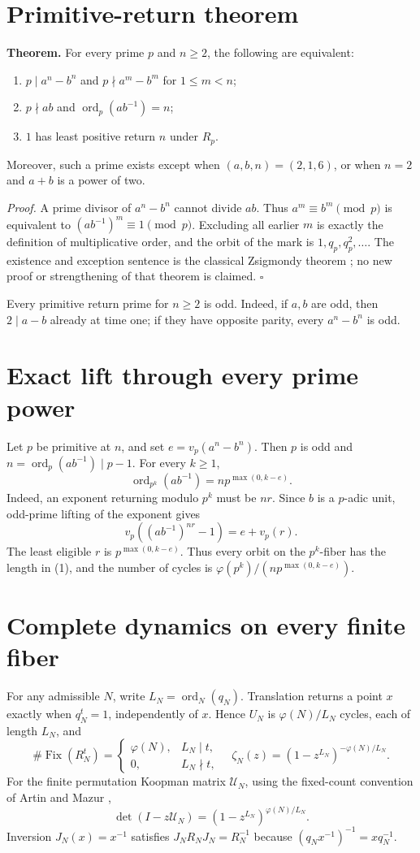 \documentclass[10pt]{article}
\begin{document}
\section{Primitive-return theorem}
\textbf{Theorem.} For every prime $p$ and $n\ge2$, the following are
equivalent:
\begin{enumerate}
\item $p\mid a^n-b^n$ and $p\nmid a^m-b^m$ for $1\le m<n$;
\item $p\nmid ab$ and $\operatorname{ord}_p(ab^{-1})=n$;
\item $1$ has least positive return $n$ under $R_p$.
\end{enumerate}
Moreover, such a prime exists except when $(a,b,n)=(2,1,6)$, or when
$n=2$ and $a+b$ is a power of two.

\textit{Proof.}
A prime divisor of $a^n-b^n$ cannot divide $ab$.  Thus
$a^m\equiv b^m\pmod p$ is equivalent to
$(ab^{-1})^m\equiv1\pmod p$.  Excluding all earlier $m$ is exactly the
definition of multiplicative order, and the orbit of the mark is
$1,q_p,q_p^2,\ldots$.  The existence and exception sentence is the classical
Zsigmondy theorem \cite{Zsigmondy1892}; no new proof or strengthening of
that theorem is claimed. \hfill$\square$

Every primitive return prime for $n\ge2$ is odd.  Indeed, if $a,b$ are odd,
then $2\mid a-b$ already at time one; if they have opposite parity, every
$a^n-b^n$ is odd.

\section{Exact lift through every prime power}
Let $p$ be primitive at $n$, and set $e=v_p(a^n-b^n)$.  Then $p$ is odd and
$n=\operatorname{ord}_p(ab^{-1})\mid p-1$.  For every $k\ge1$,
\[
\boxed{\operatorname{ord}_{p^k}(ab^{-1})
=n p^{\max(0,k-e)}}.\tag{1}
\]
Indeed, an exponent returning modulo $p^k$ must be $nr$.  Since $b$ is a
$p$-adic unit, odd-prime lifting of the exponent gives
\[
v_p((ab^{-1})^{nr}-1)=e+v_p(r).
\]
The least eligible $r$ is $p^{\max(0,k-e)}$.  Thus every orbit on the
$p^k$-fiber has the length in (1), and the number of cycles is
$\varphi(p^k)/(np^{\max(0,k-e)})$.

\section{Complete dynamics on every finite fiber}
For any admissible $N$, write $L_N=\operatorname{ord}_N(q_N)$.  Translation
returns a point $x$ exactly when $q_N^t=1$, independently of $x$.  Hence
$U_N$ is $\varphi(N)/L_N$ cycles, each of length $L_N$, and
\[
\#\operatorname{Fix}(R_N^t)=
\begin{cases}\varphi(N),&L_N\mid t,\\0,&L_N\nmid t,\end{cases}
\quad
\zeta_N(z)=(1-z^{L_N})^{-\varphi(N)/L_N}.\tag{2}
\]
For the finite permutation Koopman matrix $\mathcal U_N$, using the
fixed-count convention of Artin and Mazur \cite{ArtinMazur1965},
\[
\det(I-z\mathcal U_N)=(1-z^{L_N})^{\varphi(N)/L_N}.\tag{3}
\]
Inversion $J_N(x)=x^{-1}$ satisfies
$J_NR_NJ_N=R_N^{-1}$ because $(q_Nx^{-1})^{-1}=xq_N^{-1}$.
\end{document}
